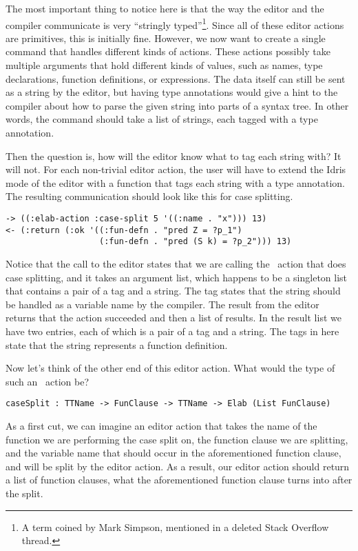 The most important thing to notice here is that the way the editor and the
compiler communicate is very ``stringly typed''\footnote{A term coined by Mark
Simpson, mentioned in a deleted Stack Overflow thread.}.  Since all of these
editor actions are primitives, this is initially fine. However, we now want to
create a single command that handles different kinds of actions. These actions
possibly take multiple arguments that hold different kinds of values, such as
names, type declarations, function definitions, or expressions.
The data itself can still be sent as a string by the editor, but having type
annotations would give a hint to the compiler about how to parse the given
string into parts of a syntax tree. In other words, the command should take a
list of strings, each tagged with a type annotation.

Then the question is, how will the editor know what to tag each string with?
It will not. For each non-trivial editor action, the user will have to extend
the Idris mode of the editor with a function that tags each string with a type
annotation. The resulting communication should look like this for case splitting.

\begin{Verbatim}
-> ((:elab-action :case-split 5 '((:name . "x"))) 13)
<- (:return (:ok '((:fun-defn . "pred Z = ?p_1")
                   (:fun-defn . "pred (S k) = ?p_2"))) 13)
\end{Verbatim}
Notice that the call to the editor states that we are calling the \Elab\ action
that does case splitting, and it takes an argument list, which happens
to be a singleton list that contains a pair of a tag and a string. The tag
states that the string should be handled as a variable name by the compiler.
The result from the editor returns that the action succeeded and then a list of
results.  In the result list we have two entries, each of which is a pair of a
tag and a string.  The tags in here state that the string represents a function
definition.

Now let's think of the other end of this editor action. What would the type of
such an \Elab\ action be?

\begin{Verbatim}
caseSplit : TTName -> FunClause -> TTName -> Elab (List FunClause)
\end{Verbatim}

As a first cut, we can imagine an editor action that takes the name of the function
we are performing the case split on, the function clause we are splitting,
and the variable name that should occur in the aforementioned function clause,
and will be split by the editor action. As a result, our editor action should return
a list of function clauses, what the aforementioned function clause turns into
after the split.

